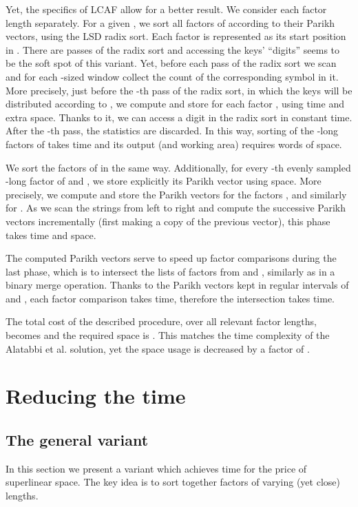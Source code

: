 \documentclass{llncs}
\begin{document}
Yet, the specifics of LCAF allow for a better result.
We consider each factor length  separately.
For a given , we sort all  factors of  
according to their Parikh vectors, using the LSD radix sort.
Each factor is represented as its start position in .
There are  passes of the radix sort and accessing the keys' 
``digits'' seems to be the soft spot of this variant.
Yet, before each pass of the radix sort 
we scan  and for each -sized window collect the count 
of the corresponding symbol in it.
More precisely, just before the -th pass of the radix sort, 
in which the keys will be distributed according to , 
we compute and store  for each factor , 
using  time and  extra space.
Thanks to it, we can access a digit in the radix sort in constant time.
After the -th pass, the  statistics are discarded.
In this way, sorting of the -long factors of  takes  
time and its output (and working area) requires  words of space.

We sort the factors of  in the same way.
Additionally, for every -th evenly sampled -long factor 
of  and , we store explicitly its Parikh vector using  space.
More precisely, we compute and store the Parikh vectors for 
the factors , 
and similarly for 
.
As we scan the strings from left to right and compute the successive 
Parikh vectors incrementally (first making a copy of the previous vector), 
this phase takes  time and  space. 

The computed Parikh vectors serve to speed up factor comparisons 
during the last phase, which is to intersect the lists of factors 
from  and , similarly as in a binary merge operation.
Thanks to the Parikh vectors kept in regular intervals of  and , 
each factor comparison takes  time, therefore the 
intersection takes  time.

The total cost of the described procedure, over all relevant factor lengths, 
becomes  and the required space is .
This matches the time complexity of the Alatabbi et al. solution, 
yet the space usage is decreased by a factor of .


\section{Reducing the time}

\subsection{The general variant}
\noindent 
In this section we present a variant which achieves  time 
for the price of superlinear space.
The key idea is to sort together factors of varying (yet close) lengths.
\end{document}
